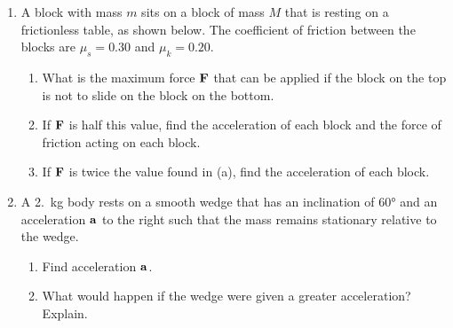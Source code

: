 \documentclass{../../../oss-classkick}
\begin{document}
\begin{enumerate}
\item A block with mass $m$ sits on a block of mass $M$ that is resting on a
  frictionless table, as shown below. The coefficient of friction between the
  blocks are $\mu_s=0.30$ and $\mu_k=0.20$.
  \begin{enumerate}[nosep]
  \item What is the maximum force $\mathbf{F}$ that can be applied if the block on
    the top is not to slide on the block on the bottom.
  \item If $\mathbf{F}$ is half this value, find the acceleration of each block and
    the force of friction acting on each block.
  \item If $\mathbf{F}$ is twice the value found in (a), find the acceleration of
    each block.
  \end{enumerate}
  \vspace{2.25in}
  \newpage
  
\item A \SI{2.}{\kilo\gram} body rests on a smooth wedge that has an inclination
  of \ang{60} and an acceleration $\mathbf{a}$ to the right such that the mass
  remains stationary relative to the wedge.
  \begin{enumerate}
  \item Find acceleration $\mathbf{a}$.
  \item What would happen if the wedge were given a greater acceleration?
    Explain.
  \end{enumerate}
  \newpage
  

\end{enumerate}
\end{document}
